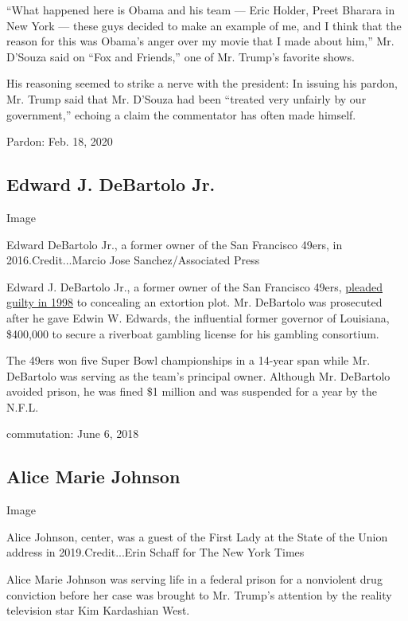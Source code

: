 ``What happened here is Obama and his team --- Eric Holder, Preet
Bharara in New York --- these guys decided to make an example of me, and
I think that the reason for this was Obama's anger over my movie that I
made about him,'' Mr. D'Souza said on ``Fox and Friends,'' one of Mr.
Trump's favorite shows.

His reasoning seemed to strike a nerve with the president: In issuing
his pardon, Mr. Trump said that Mr. D'Souza had been ``treated very
unfairly by our government,'' echoing a claim the commentator has often
made himself.

Pardon: Feb. 18, 2020

\hypertarget{edward-j-debartolo-jr}{%
\subsection{Edward J. DeBartolo Jr.}\label{edward-j-debartolo-jr}}

Image

Edward DeBartolo Jr., a former owner of the San Francisco 49ers, in
2016.Credit...Marcio Jose Sanchez/Associated Press

Edward J. DeBartolo Jr., a former owner of the San Francisco 49ers,
\href{https://www.nytimes.com/2020/02/18/us/politics/trump-pardon-blagojevich-debartolo.html}{pleaded
guilty in 1998} to concealing an extortion plot. Mr. DeBartolo was
prosecuted after he gave Edwin W. Edwards, the influential former
governor of Louisiana, \$400,000 to secure a riverboat gambling license
for his gambling consortium.

The 49ers won five Super Bowl championships in a 14-year span while Mr.
DeBartolo was serving as the team's principal owner. Although Mr.
DeBartolo avoided prison, he was fined \$1 million and was suspended for
a year by the N.F.L.

commutation: June 6, 2018

\hypertarget{alice-marie-johnson}{%
\subsection{Alice Marie Johnson}\label{alice-marie-johnson}}

Image

Alice Johnson, center, was a guest of the First Lady at the State of the
Union address in 2019.Credit...Erin Schaff for The New York Times

Alice Marie Johnson was serving life in a federal prison for a
nonviolent drug conviction before her case was brought to Mr. Trump's
attention by the reality television star Kim Kardashian West.

